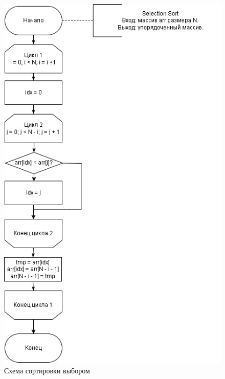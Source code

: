 \documentclass[a4paper,12pt]{report}
\begin{document}
	\begin{figure}[h]
		\centering
		\includegraphics[width=0.9\linewidth]{selection}
		\caption{Схема сортировки выбором}
		\label{fig:schema_selection}
	\end{figure}
	
\end{document}
